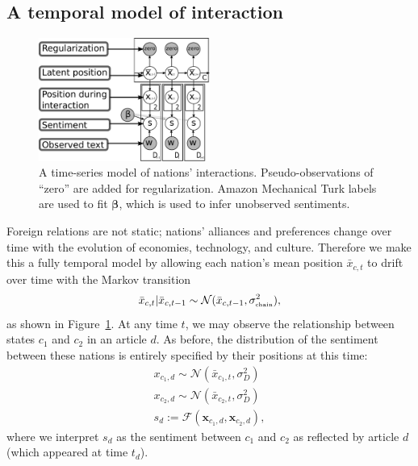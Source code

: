 \subsection{A temporal model of interaction}
\label{sec:fr_time_series_model}
\begin{figure}
  \center
  \includegraphics[width=0.5\textwidth]{chapter_foreign_relations/figures/countries_gm.pdf}
  \caption{A time-series model of nations' interactions.
    Pseudo-observations of ``zero'' are added for regularization.
    Amazon Mechanical Turk labels are used to fit $\bm \beta$, which is
    used to infer unobserved sentiments.}
  \label{fig:fa_gm}
\end{figure}

Foreign relations are not static; nations' alliances and preferences
change over time with the evolution of economies, technology, and
culture.  Therefore we make this a fully temporal model by
allowing each nation's mean position $\bar x_{c,t}$ to drift over
time with the Markov transition
\begin{align}
  \label{eq:fr_interaction_position_given_mean}
  \bar x_{c,t} | \bar x_{c,t-1} \sim \mathcal{N}(\bar x_{c,t-1},
  \sigma_{\mbox{\tiny chain}}^2),
\end{align}
as shown in Figure~\ref{fig:fa_gm}. At any time $t$, we may observe
the relationship between states $c_1$ and $c_2$ in an article $d$.  As
before, the distribution of the sentiment between these nations is
entirely specified by their positions at this time:
\begin{align}
  x_{c_1,d} \sim \mathcal{N}(\bar x_{c_1, t}, \sigma_D^2) \nonumber \\
  x_{c_2,d} \sim \mathcal{N}(\bar x_{c_2, t}, \sigma_D^2) \nonumber \\
  s_d := \mathcal{F}(\bm x_{c_1,d}, \bm x_{c_2,d}), \label{eq:sentiment_space}
\end{align}
where we interpret $s_d$ as the sentiment between $c_1$ and $c_2$ as
reflected by article $d$ (which appeared at time $t_d$).

